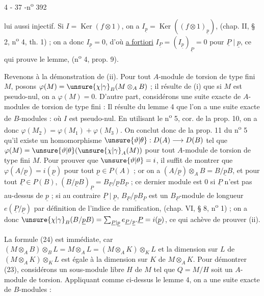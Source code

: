 \begin{center}4 - 37 -\hfill n\textsuperscript{o} 392\end{center}

lui aussi injectif. Si $I=\operatorname{Ker}(f\otimes1)$, on a $I_{\underline{p}}=\operatorname{Ker}((f\otimes1)_{\underline{p}})$, (chap. II, § 2, n\textsuperscript{o} 4, th. 1) ; on a donc $I_{\underline{p}}=0$, d'où \uline{a fortiori} $I_{\underline{P}}=(I_{\underline{p}})_{\underline{P}}=0$ pour $\underline{P}\mid\underline{p}$, ce qui prouve le lemme, (n\textsuperscript{o} 4, prop. 9).

Revenons à la démonstration de (ii). Pour tout $A$-module de torsion de type fini $M$, posons $\varphi(M)=\unsure{\chi|\gamma}_B(M\otimes_A B)$ ; il résulte de (i) que si $M$ est pseudo-nul, on a $\varphi(M)=0$. D'autre part, considérons une suite exacte de $A$-modules de torsion de type fini :
Il résulte du lemme 4 que l'on a une suite exacte de $B$-modules :
où $I$ est pseudo-nul. En utilisant le n\textsuperscript{o} 5, cor. de la prop. 10, on a donc $\varphi(M_2)=\varphi(M_1)+\varphi(M_3)$. On conclut donc de la prop. 11 du n\textsuperscript{o} 5 qu'il existe un homomorphisme $\unsure{\vartheta|\theta}:D(A)\longrightarrow D(B)$ tel que $\varphi(M)=\unsure{\vartheta|\theta}(\unsure{\chi|\gamma}_A(M))$ pour tout $A$-module de torsion de type fini $M$. Pour prouver que $\unsure{\vartheta|\theta}=i$, il suffit de montrer que $\varphi(A/\underline{p})=i(\underline{p})$ pour tout $\underline{p}\in P(A)$ ; or on a $(A/\underline{p})\otimes_A B=B/\underline{p}B$, et pour tout $\underline{P}\in P(B)$, $(B/\underline{p}B)_{\underline{P}}=B_{\underline{P}}/\underline{p}B_{\underline{P}}$ ; ce dernier module est $0$ si $\underline{P}$ n'est pas au-dessus de $\underline{p}$ ; si au contraire $\underline{P}\mid\underline{p}$, $B_{\underline{P}}/\underline{p}B_{\underline{P}}$ est un $B_{\underline{P}}$-module de longueur $e(\underline{P}/\underline{p})$ par définition de l'indice de ramification, (chap. VI, § 8, n\textsuperscript{o} 1) ; on a donc $\unsure{\chi|\gamma}_B(B/\underline{p}B)=\sum_{\underline{P}\mid\underline{p}}e_{\underline{P}/\underline{p}}.\underline{P}=i(\underline{p})$, ce qui achève de prouver (ii).

La formule (24) est immédiate, car $(M\otimes_A B)\otimes_B L=M\otimes_A L=(M\otimes_A K)\otimes_K L$ et la dimension sur $L$ de $(M\otimes_A K)\otimes_K L$ est égale à la dimension sur $K$ de $M\otimes_A K$. Pour démontrer (23), considérons un sous-module libre $H$ de $M$ tel que $Q=M/H$ soit un $A$-module de torsion. Appliquant comme ci-dessus le lemme 4, on a une suite exacte de $B$-modules :

